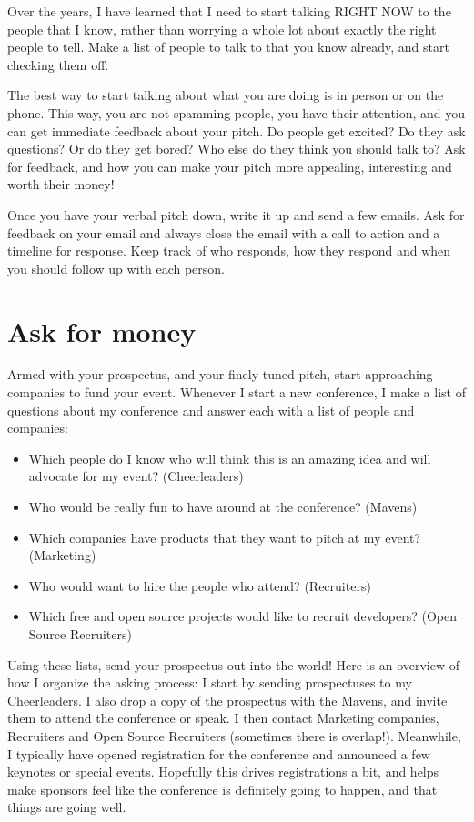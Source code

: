 Over the years, I have learned that I need to start talking RIGHT NOW to the
people that I know, rather than worrying a whole lot about exactly the right
people to tell.  Make a list of people to talk to that you know already, and
start checking them off.

The best way to start talking about what you are doing is in person or on the
phone. This way, you are not spamming people, you have their attention, and you
can get immediate feedback about your pitch. Do people get excited? Do they ask
questions? Or do they get bored? Who else do they think you should talk to? Ask
for feedback, and how you can make your pitch more appealing, interesting and
worth their money!

Once you have your verbal pitch down, write it up and send a few emails. Ask for
feedback on your email and always close the email with a call to action and a
timeline for response.  Keep track of who responds, how they respond and when
you should follow up with each person.

\section*{Ask for money}
Armed with your prospectus, and your finely tuned pitch, start approaching
companies to fund your event. Whenever I start a new conference, I make a list
of questions about my conference and answer each with a list of people and
companies: 
\begin{itemize}
\item Which people do I know who will think this is an amazing idea and will
advocate for my event? (Cheerleaders)
\item Who would be really fun to have around at the conference? (Mavens)
\item Which companies have products that they want to pitch at my event?
(Marketing)
\item Who would want to hire the people who attend? (Recruiters)
\item Which free and open source projects would like to recruit developers?
(Open Source Recruiters)
\end{itemize}

Using these lists, send your prospectus out into the world! Here is an overview
of how I organize the asking process: 
I start by sending prospectuses to my Cheerleaders. I also drop a copy of the
prospectus with the Mavens, and invite them to attend the conference or speak. I
then contact Marketing companies, Recruiters and Open Source Recruiters
(sometimes there is overlap!).
Meanwhile, I typically have opened registration for the conference and announced
a few keynotes or special events. Hopefully this drives registrations a bit, and
helps make sponsors feel like the conference is definitely going to happen, and
that things are going well.

